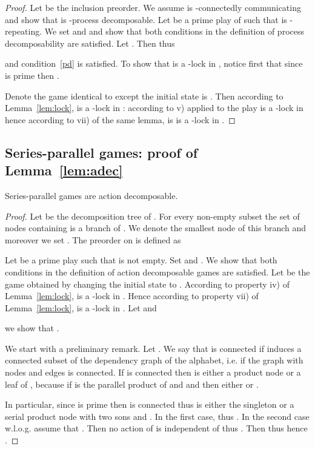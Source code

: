 \documentclass[a4paper,UKenglish]{lipics-v2016}
\begin{document}
\begin{proof}
Let  be the inclusion preorder.
We assume  is -connectedly communicating and show that  is -process decomposable.
Let  be a prime play of  such that  is -repeating.
We set  and 
and show that both conditions in the definition of process decomposability are satisfied.
Let .
Then 
thus

and condition~\eqref{pd} is satisfied.
To show that  is a -lock in ,
notice first that since  is prime then .

Denote  the game identical to  except the initial state is .
Then according to Lemma~\ref{lem:lock},
 is a -lock in :
according to v) applied to 
the play  is a -lock in 
hence according to vii) of the same lemma,
 is is a -lock in .
\end{proof}


\subsection{Series-parallel games: proof of Lemma~\ref{lem:adec}}


{Series-parallel games
are action decomposable.
}
\begin{proof}
Let  be the decomposition tree of .
For every non-empty subset  the set of nodes containing 
is a branch of .
We denote  the smallest node of this branch and moreover we set .
The preorder  on  is defined as 


Let  be a prime play such that  is not empty.
Set  and .
We show that both conditions in
the definition of action decomposable games are satisfied.
Let  be the game obtained by changing the initial state to .
According to property iv) of Lemma~\ref{lem:lock},  is a -lock in . Hence according to 
property vii) of Lemma~\ref{lem:lock},  is a -lock in .
Let
 and

we show that .


We start with a preliminary remark.
Let .
We say that  is connected if 
 induces a connected subset of the dependency graph of the alphabet, i.e. if the graph with nodes  and edges  is connected.
If  is connected then  is either a product node or a leaf of , because if  is the parallel product of  and  and  then either  or .

In particular, since  is prime then  is connected 
thus  is either the singleton 
 or a serial product node with two sons  and .
In the first case,  thus .
In the second case w.l.o.g. assume that .
Then no action of  is independent of 
thus .
Then  
thus 
hence
.
\end{proof}
\end{document}
